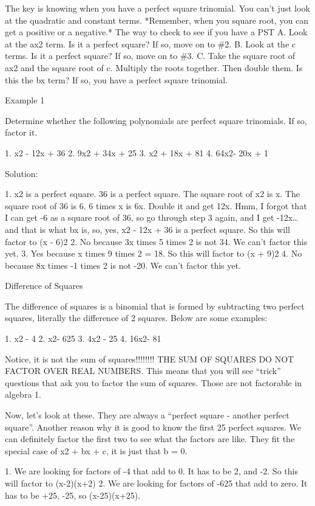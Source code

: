 The key is knowing when you have a perfect square trinomial. You can't just look at the quadratic and constant terms. *Remember, when you square root, you can get a positive or a negative.* The way to check to see if you have a PST
A. Look at the ax2 term. Is it a perfect square? If so, move on to \#2.
B. Look at the c terms. Is it a perfect square? If so, move on to \#3.
C. Take the square root of ax2 and the square root of c. Multiply the roots together. Then double them. Is this the bx term? If so, you have a perfect square trinomial.

Example 1

Determine whether the following polynomials are perfect square trinomials. If so, factor it.

1. x2 - 12x + 36
2. 9x2 + 34x + 25
3. x2 + 18x + 81
4. 64x2- 20x + 1

Solution:

1. x2 is a perfect square. 36 is a perfect square. The square root of x2 is x. The square root of 36 is 6. 6 times x is 6x. Double it and get 12x. Hmm, I forgot that I can get -6 as a square root of 36, so go through step 3 again, and I get -12x\ldots{} and that is what bx is, so, yes, x2 - 12x + 36 is a perfect square. So this will factor to (x - 6)2
2. No because 3x times 5 times 2 is not 34. We can't factor this yet.
3. Yes because x times 9 times 2 = 18. So this will factor to (x + 9)2 
4. No because 8x times -1 times 2 is not -20. We can't factor this yet.

Difference of Squares

The difference of squares is a binomial that is formed by subtracting two perfect squares, literally the difference of 2 squares. Below are some examples:

1. x2 - 4
2. x2- 625
3. 4x2 - 25
4. 16x2- 81

Notice, it is not the sum of squares!!!!!!!! THE SUM OF SQUARES DO NOT FACTOR OVER REAL NUMBERS. This means that you will see ``trick'' questions that ask you to factor the sum of squares. Those are not factorable in algebra 1.

Now, let's look at these. They are always a ``perfect square - another perfect square''. Another reason why it is good to know the first 25 perfect squares. We can definitely factor the first two to see what the factors are like. They fit the special case of x2 + bx + c, it is just that b = 0.

1. We are looking for factors of -4 that add to 0. It has to be 2, and -2. So this will factor to (x-2)(x+2)
2. We are looking for factors of -625 that add to zero. It has to be +25, -25, so (x-25)(x+25).

